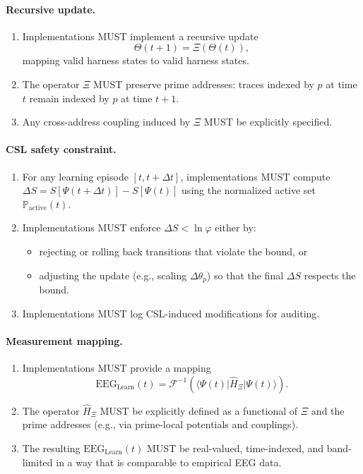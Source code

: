 \documentclass[11pt]{article}
\begin{document}
\paragraph{Recursive update.}

\begin{enumerate}[label=(M\arabic*),resume,noitemsep]
  \item Implementations MUST implement a recursive update
  \[
  \Theta(t+1) = \Xi(\Theta(t)),
  \]
  mapping valid harness states to valid harness states.
  \item The operator $\Xi$ MUST preserve prime addresses: traces indexed by $p$ at time $t$ remain indexed by $p$ at time $t+1$.
  \item Any cross-address coupling induced by $\Xi$ MUST be explicitly specified.
\end{enumerate}

\paragraph{CSL safety constraint.}

\begin{enumerate}[label=(M\arabic*),resume,noitemsep]
  \item For any learning episode $[t, t+\Delta t]$, implementations MUST compute $\Delta S = S[\Psi(t+\Delta t)] - S[\Psi(t)]$ using the normalized active set $\mathbb{P}_{\mathrm{active}}(t)$.
  \item Implementations MUST enforce $\Delta S < \ln \varphi$ either by:
  \begin{itemize}[noitemsep]
    \item rejecting or rolling back transitions that violate the bound, or
    \item adjusting the update (e.g., scaling $\Delta \theta_p$) so that the final $\Delta S$ respects the bound.
  \end{itemize}
  \item Implementations MUST log CSL-induced modifications for auditing.
\end{enumerate}

\paragraph{Measurement mapping.}

\begin{enumerate}[label=(M\arabic*),resume,noitemsep]
  \item Implementations MUST provide a mapping
  \[
  \mathrm{EEG}_{\mathrm{Learn}}(t) = \mathcal{F}^{-1}\left(\langle \Psi(t) \vert \hat{H}_\Xi \vert \Psi(t) \rangle\right).
  \]
  \item The operator $\hat{H}_\Xi$ MUST be explicitly defined as a functional of $\Xi$ and the prime addresses (e.g., via prime-local potentials and couplings).
  \item The resulting $\mathrm{EEG}_{\mathrm{Learn}}(t)$ MUST be real-valued, time-indexed, and band-limited in a way that is comparable to empirical EEG data.
\end{enumerate}
\end{document}
